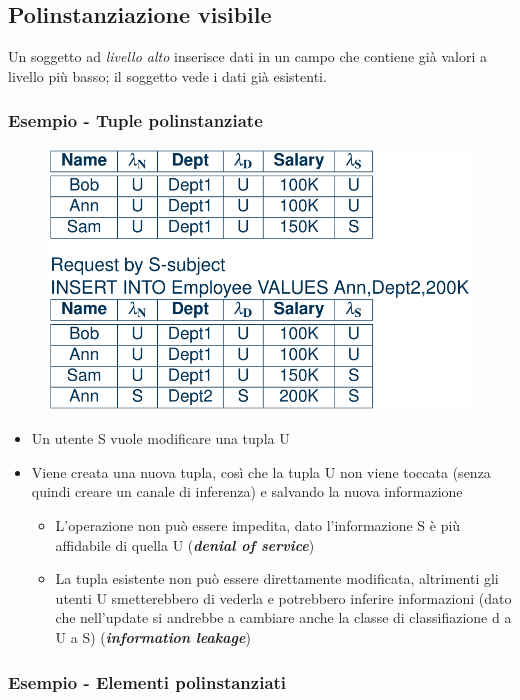 \documentclass{report}
\begin{document}
\subsection{Polinstanziazione visibile}
Un soggetto ad \textit{livello alto} inserisce dati in un campo che contiene già valori 
a livello più basso; il soggetto vede i dati già esistenti.

\subsubsection{Esempio - Tuple polinstanziate}

\begin{figure}[H]
    \centering
    \includegraphics[width=0.8\linewidth]{images/poly3.png}
\end{figure}

\begin{itemize}
    \item Un utente S vuole modificare una tupla U 
    \item Viene creata una nuova tupla, così che la tupla U non viene toccata (senza 
    quindi creare un canale di inferenza) e salvando la nuova informazione
    \begin{itemize}
        \item L'operazione non può essere impedita, dato l'informazione S è più affidabile di quella U (\textit{\textbf{denial of service}})
        \item La tupla esistente non può essere direttamente modificata, altrimenti gli utenti U smetterebbero di 
        vederla e potrebbero inferire informazioni (dato che nell'update si andrebbe a cambiare anche la classe 
        di classifiazione d a U a S) (\textit{\textbf{information leakage}})
    \end{itemize}
\end{itemize}


\subsubsection{Esempio - Elementi polinstanziati}
\end{document}
